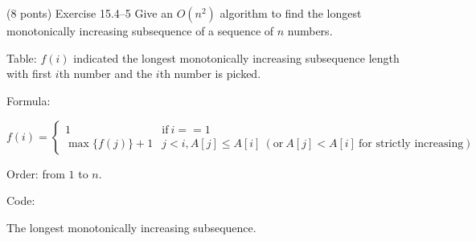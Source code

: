 \documentclass[paper=a4, fontsize=11pt]{scrartcl} %
\begin{document}
\maketitle %

\section{}

\begin{fancyquotes}
  (8 ponts) Exercise 15.4--5 Give an $O(n^2)$ algorithm to find the
  longest monotonically increasing subsequence of a sequence of $n$
  numbers.
\end{fancyquotes}

Table: $f(i)$ indicated the longest monotonically increasing
subsequence length with first $i$th number and the $i$th number is
picked.

Formula:

\begin{equation*}
  f(i)=
  \begin{cases}
    1 & \text{if}\ i==1 \\
    \max\{f(j)\}+1 & j<i, A[j]\leq A[i]\ (\text{or}\ A[j]<A[i]\ \text{for
    strictly increasing})
  \end{cases}
\end{equation*}

Order: from $1$ to $n$.

Code:

\begin{algorithm}[H]
  \caption{The longest monotonically increasing subsequence.}
\end{algorithm}

\pagebreak

\section{}
\end{document}
